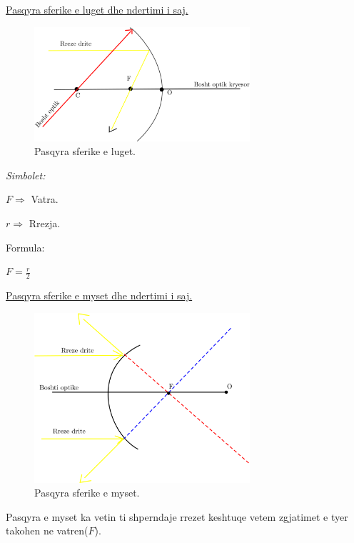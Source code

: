 \documentclass[twocolumn]{article}
\begin{document}
\begin{center}
	\underline{Pasqyra sferike e luget dhe ndertimi i saj.}
\end{center}
\begin{figure}[h]
	\includegraphics[width=80mm]{Imazhet/pasqyra sferike e luget.png}
	\caption{Pasqyra sferike e luget.}
	\label{fig:boat1}
\end{figure}

\begin{center}
	\textit{Simbolet:}
\end{center}

$F \Rightarrow $ Vatra.

$r \Rightarrow$ Rrezja.



\begin{center}
	Formula:
\end{center}

$F=\frac{r}{2}$

 \begin{center}
 	\underline{Pasqyra sferike e myset dhe ndertimi i saj.}
 \end{center}
 \begin{figure}[h]
 	\includegraphics[width=80mm]{Imazhet/pasqyra sferike e myset.png}
 	\caption{Pasqyra sferike e myset.}
 	\label{fig:boat1}
 \end{figure}

Pasqyra e myset ka vetin ti shperndaje rrezet keshtuqe vetem zgjatimet e tyer takohen ne vatren($F$).\\
\end{document}
